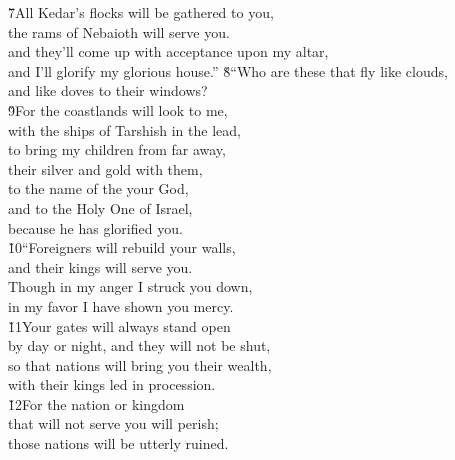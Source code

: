 \begin{poetry}
\poeml \v{7}All Kedar's flocks will be gathered to you, \\
\poemll    the rams of Nebaioth will serve you. \\
\poeml and they'll come up with acceptance upon my altar, \\
\poemll    and I'll glorify my glorious house.''
\poeml \v{8}``Who are these that fly like clouds, \\
\poemll    and like doves to their windows? \\
\poeml \v{9}For the coastlands will look to me, \\
\poemll    with the ships of Tarshish in the lead, \\
\poeml to bring my children from far away, \\
\poemll    their silver and gold with them, \\
\poeml to the name of the  your God, \\
\poemll    and to the Holy One of Israel, \\
\poemlll       because he has glorified you. \\
\poeml \v{10}``Foreigners will rebuild your walls, \\
\poemll    and their kings will serve you. \\
\poeml Though in my anger I struck you down, \\
\poemlll       in my favor I have shown you mercy. \\
\poeml \v{11}Your gates will always stand open \\
\poemll    by day or night, and they will not be shut, \\
\poeml so that nations will bring you their wealth, \\
\poemll    with their kings led in procession. \\
\poeml \v{12}For the nation or kingdom \\
\poemll    that will not serve you will perish; \\
\poemlll       those nations will be utterly ruined. \\

\end{poetry}
